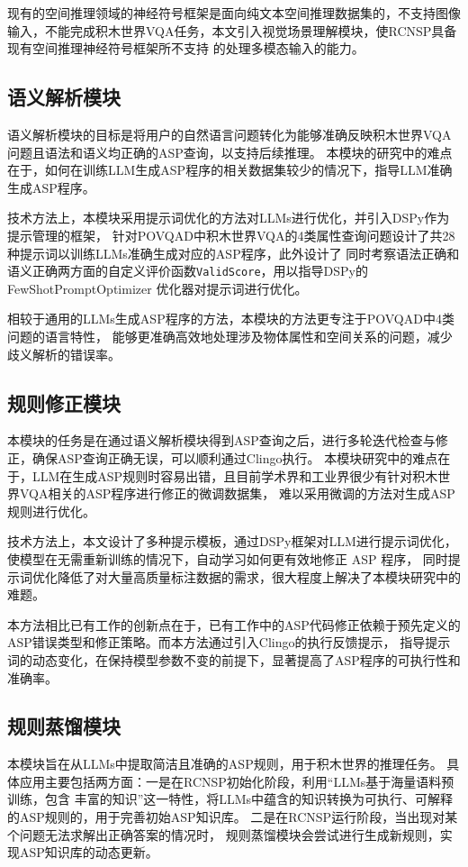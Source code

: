 现有的空间推理领域的神经符号框架\cite{wang2024dspy}是面向纯文本空间推理数据集的，不支持图像输入，不能完成积木世界VQA任务，本文引入视觉场景理解模块，使RCNSP具备现有空间推理神经符号框架所不支持
的处理多模态输入的能力。
\subsection{语义解析模块}
语义解析模块的目标是将用户的自然语言问题转化为能够准确反映积木世界VQA问题且语法和语义均正确的ASP查询，以支持后续推理。
本模块的研究中的难点在于，如何在训练LLM生成ASP程序的相关数据集较少的情况下，指导LLM准确生成ASP程序。

技术方法上，本模块采用提示词优化的方法对LLMs进行优化，并引入DSPy作为提示管理的框架，
针对POVQAD中积木世界VQA的4类属性查询问题设计了共28种提示词以训练LLMs准确生成对应的ASP程序，此外设计了
同时考察语法正确和语义正确两方面的自定义评价函数\texttt{ValidScore}，用以指导DSPy的 FewShotPromptOptimizer 优化器对提示词进行优化。

相较于通用的LLMs生成ASP程序的方法，本模块的方法更专注于POVQAD中4类问题的语言特性，
能够更准确高效地处理涉及物体属性和空间关系的问题，减少歧义解析的错误率。
\subsection{规则修正模块}
本模块的任务是在通过语义解析模块得到ASP查询之后，进行多轮迭代检查与修正，确保ASP查询正确无误，可以顺利通过Clingo执行。
本模块研究中的难点在于，LLM在生成ASP规则时容易出错，且目前学术界和工业界很少有针对积木世界VQA相关的ASP程序进行修正的微调数据集，
难以采用微调的方法对生成ASP规则进行优化。

技术方法上，本文设计了多种提示模板，通过DSPy框架对LLM进行提示词优化，使模型在无需重新训练的情况下，自动学习如何更有效地修正 ASP 程序，
同时提示词优化降低了对大量高质量标注数据的需求，很大程度上解决了本模块研究中的难题。

本方法相比已有工作的创新点在于，已有工作中的ASP代码修正依赖于预先定义的ASP错误类型和修正策略。而本方法通过引入Clingo的执行反馈提示，
指导提示词的动态变化，在保持模型参数不变的前提下，显著提高了ASP程序的可执行性和准确率。
\subsection{规则蒸馏模块}
本模块旨在从LLMs中提取简洁且准确的ASP规则，用于积木世界的推理任务。
具体应用主要包括两方面：一是在RCNSP初始化阶段，利用“LLMs基于海量语料预训练，包含
丰富的知识”这一特性，将LLMs中蕴含的知识转换为可执行、可解释的ASP规则的，用于完善初始ASP知识库。
二是在RCNSP运行阶段，当出现对某个问题无法求解出正确答案的情况时，
规则蒸馏模块会尝试进行生成新规则，实现ASP知识库的动态更新。

